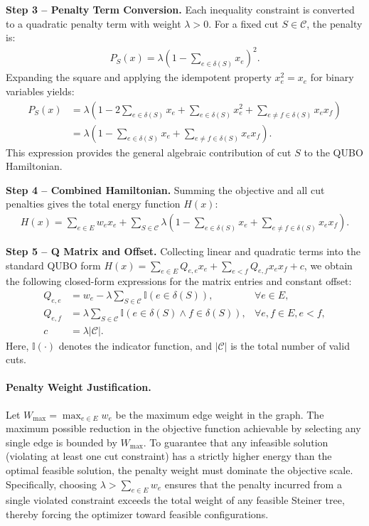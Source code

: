 \documentclass[12pt]{article}
\begin{document}
\textbf{Step 3 -- Penalty Term Conversion.} Each inequality constraint is converted to a quadratic penalty term with weight $\lambda > 0$. For a fixed cut $S \in \mathcal{C}$, the penalty is:
\begin{align}
P_S(x) = \lambda \left( 1 - \sum_{e \in \delta(S)} x_e \right)^2.
\end{align}
Expanding the square and applying the idempotent property $x_e^2 = x_e$ for binary variables yields:
\begin{align}
P_S(x) &= \lambda \left( 1 - 2\sum_{e \in \delta(S)} x_e + \sum_{e \in \delta(S)} x_e^2 + \sum_{e \neq f \in \delta(S)} x_e x_f \right) \\
&= \lambda \left( 1 - \sum_{e \in \delta(S)} x_e + \sum_{e \neq f \in \delta(S)} x_e x_f \right).
\end{align}
This expression provides the general algebraic contribution of cut $S$ to the QUBO Hamiltonian.

\textbf{Step 4 -- Combined Hamiltonian.} Summing the objective and all cut penalties gives the total energy function $H(x)$:
\begin{align}
H(x) = \sum_{e \in E} w_e x_e + \sum_{S \in \mathcal{C}} \lambda \left( 1 - \sum_{e \in \delta(S)} x_e + \sum_{e \neq f \in \delta(S)} x_e x_f \right).
\end{align}

\textbf{Step 5 -- Q Matrix and Offset.} Collecting linear and quadratic terms into the standard QUBO form $H(x) = \sum_{e \in E} Q_{e,e} x_e + \sum_{e < f} Q_{e,f} x_e x_f + c$, we obtain the following closed-form expressions for the matrix entries and constant offset:
\begin{align}
Q_{e,e} &= w_e - \lambda \sum_{S \in \mathcal{C}} \mathbb{I}(e \in \delta(S)), & \forall e \in E, \\
Q_{e,f} &= \lambda \sum_{S \in \mathcal{C}} \mathbb{I}(e \in \delta(S) \land f \in \delta(S)), & \forall e, f \in E, e < f, \\
c &= \lambda |\mathcal{C}|. &
\end{align}
Here, $\mathbb{I}(\cdot)$ denotes the indicator function, and $|\mathcal{C}|$ is the total number of valid cuts.

\paragraph{Penalty Weight Justification.}
Let $W_{\max} = \max_{e \in E} w_e$ be the maximum edge weight in the graph. The maximum possible reduction in the objective function achievable by selecting any single edge is bounded by $W_{\max}$. To guarantee that any infeasible solution (violating at least one cut constraint) has a strictly higher energy than the optimal feasible solution, the penalty weight must dominate the objective scale. Specifically, choosing $\lambda > \sum_{e \in E} w_e$ ensures that the penalty incurred from a single violated constraint exceeds the total weight of any feasible Steiner tree, thereby forcing the optimizer toward feasible configurations.
\end{document}
